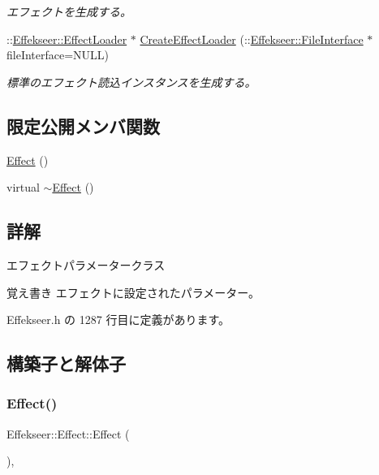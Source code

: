 \begin{DoxyCompactItemize}
\begin{DoxyCompactList}\small\item\em エフェクトを生成する。 \end{DoxyCompactList}\item 
\+::\mbox{\hyperlink{class_effekseer_1_1_effect_loader}{Effekseer\+::\+Effect\+Loader}} $\ast$ \mbox{\hyperlink{class_effekseer_1_1_effect_a462e3f0ea00c20329789521ba47bd2d4}{Create\+Effect\+Loader}} (\+::\mbox{\hyperlink{class_effekseer_1_1_file_interface}{Effekseer\+::\+File\+Interface}} $\ast$file\+Interface=N\+U\+LL)
\begin{DoxyCompactList}\small\item\em 標準のエフェクト読込インスタンスを生成する。 \end{DoxyCompactList}\end{DoxyCompactItemize}
\subsection*{限定公開メンバ関数}
\begin{DoxyCompactItemize}
\item 
\mbox{\hyperlink{class_effekseer_1_1_effect_ac36d4aa804244d12a64ad8e2f9681ed0}{Effect}} ()
\item 
virtual \mbox{\hyperlink{class_effekseer_1_1_effect_aeff1be44efe48d64e2b398d9186c1011}{$\sim$\+Effect}} ()
\end{DoxyCompactItemize}


\subsection{詳解}
エフェクトパラメータークラス 

\begin{DoxyNote}{覚え書き}
エフェクトに設定されたパラメーター。 
\end{DoxyNote}


 Effekseer.\+h の 1287 行目に定義があります。



\subsection{構築子と解体子}
\mbox{\label{class_effekseer_1_1_effect_ac36d4aa804244d12a64ad8e2f9681ed0}} 
\subsubsection{\texorpdfstring{Effect()}{Effect()}}
{\footnotesize\ttfamily Effekseer\+::\+Effect\+::\+Effect (\begin{DoxyParamCaption}{ }\end{DoxyParamCaption})\hspace{0.3cm}{\ttfamily [inline]}, {\ttfamily [protected]}}



